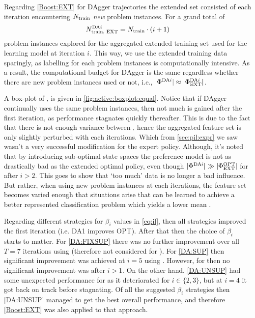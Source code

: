 Regarding \ref{Boost:EXT} for DAgger trajectories the extended set 
consisted of each iteration encountering $N_{\text{train}}$ \emph{new} problem 
instances. For a grand total of 
\begin{equation}
N^{\text{DA}i}_{\text{train, EXT}}=N_{\text{train}}\cdot (i+1) 
\end{equation}
problem instances explored for the aggregated extended training set used for 
the learning model at iteration $i$.
This way, we use the extended training data sparingly, as labelling for each 
problem instances is computationally intensive. As a result, the computational 
budget for DAgger is the same regardless whether there are new problem instances 
used or not, i.e., $\lvert\Phi^{\text{DA}i}\rvert\approx\lvert\Phi^{\text{DA}i}_{\text{EXT}}\rvert$.

A box-plot of \namerho, is given in \cref{fig:active:boxplot:equal}. 
Notice that if DAgger continually uses the same problem instances, then not much is gained after the first iteration, as performance stagnates quickly thereafter.
This is due to the fact that there is not enough variance between 
, hence the aggregated feature set  is only slightly perturbed with each iterations. 
Which from \cref{sec:pil:expr} we saw wasn't a very successful modification for the expert policy. Although, it's noted that by introducing sub-optimal state spaces 
the preference model is not as drastically bad as the extended optimal policy, 
even though $\lvert\Phi^{\text{DA}i}\rvert\gg\lvert\Phi^{\text{OPT}}_{\text{EXT}}\rvert$ for  after $i>2$. This goes to show that `too much' data is no longer a bad influence. 
But rather, when using new problem instances at each iterations, the feature set becomes varied enough that situations arise that can be learned to achieve a better represented classification problem which yields a lower mean \namerho.

Regarding different strategies for $\beta_i$ values in \cref{eq:il}, then all strategies improved the first iteration (i.e. DA1 improves OPT). After that then the choice of $\beta_i$ starts to matter. 
For \ref{DA:FIXSUP} there was no further improvement over all $T=7$ iterations using  (therefore not considered for ).
For \ref{DA:SUP} then significant improvement was achieved at $i=5$ using .
However, for  then no significant improvement was after $i>1$. 
On the other hand, \ref{DA:UNSUP} had some unexpected performance for  as it  deteriorated for $i\in\{2,3\}$, but at $i=4$ it got back on track before stagnating.
Of all the suggested $\beta_i$ strategies then \ref{DA:UNSUP} managed to get the best overall performance, and therefore \ref{Boost:EXT} was also applied to that approach. 

